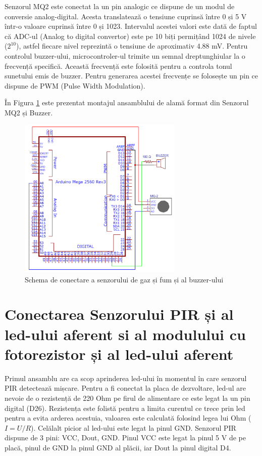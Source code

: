 Senzorul MQ2 este conectat la un pin analogic ce dispune de un modul de conversie analog-digital. Acesta translatează o tensiune cuprinsă între 0 și 5 V într-o valoare cuprinsă între 0 și 1023. Intervalul acestei valori este dată de faptul că ADC-ul (Analog to digital convertor) este pe 10 biți permițând 1024 de nivele ($2^{10}$), astfel fiecare nivel reprezintă o tensiune de aproximativ 4.88 mV.
Pentru controlul buzzer-ului, microcontroler-ul trimite un semnal dreptunghiular la o frecvență specifică. Această frecvență este folosită pentru a controla tonul sunetului emis de buzzer. Pentru generarea acestei frecvențe se folosește un pin ce dispune de PWM (Pulse Width Modulation).

În Figura \ref{fig:conexiune_mq2_buzzer} este prezentat montajul ansamblului de alamă format din Senzorul MQ2 și Buzzer.

\begin{figure}[H]
\includegraphics[width=0.7\textwidth, height=0.7 \textwidth]{bachelors_ro/images/conexiune_mq2_buzzer.png}
\caption{Schema de conectare a senzorului de gaz și fum și al buzzer-ului}
\label{fig:conexiune_mq2_buzzer}
\end{figure}

\section{Conectarea Senzorului PIR și al led-ului aferent si al modulului cu fotorezistor și al led-ului aferent}
Primul ansamblu are ca scop aprinderea led-ului în momentul în care senzorul PIR detectează mișcare. Pentru a fi conectat la placa de dezvoltare, led-ul are nevoie de o rezistență de 220 Ohm pe firul de alimentare ce este legat la un pin digital (D26). Rezistența este folistă pentru a limita curentul ce trece prin led pentru a evita arderea acestuia, valoarea este calculată folosind legea lui Ohm ($I=U/R$). Celălalt picior al led-ului este legat la pinul GND. Senzorul PIR dispune de 3 pini: VCC, Dout, GND. Pinul VCC este legat la pinul 5 V de pe placă, pinul de GND la pinul GND al plăcii, iar Dout la pinul digital D4.

